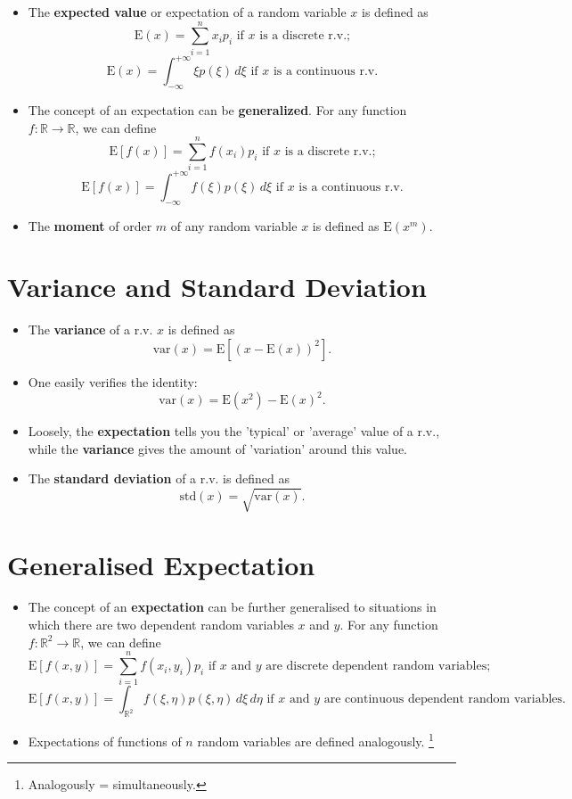 \begin{itemize}[label=\textbullet]
    \item The \textbf{expected value} or expectation of a random variable \( x \) is defined as
    \[
    \text{E}(x) = \sum_{i=1}^n x_i p_i \text{ if } x \text{ is a discrete r.v.;}
    \]
    \[
    \text{E}(x) = \int_{-\infty}^{+\infty} \xi p(\xi) \, d\xi \text{ if } x \text{ is a continuous r.v.}
    \]
    \item The concept of an expectation can be \textbf{generalized}. For any function \( f : \mathbb{R} \to \mathbb{R} \), we can define
    \[
    \text{E}[f(x)] = \sum_{i=1}^n f(x_i)p_i \text{ if } x \text{ is a discrete r.v.;}
    \]
    \[
    \text{E}[f(x)] = \int_{-\infty}^{+\infty} f(\xi) p(\xi) \, d\xi \text{ if } x \text{ is a continuous r.v.}
    \]
    \item The \textbf{moment} of order \( m \) of any random variable \( x \) is defined as \( \text{E}(x^m) \).
\end{itemize}

\section{Variance and Standard Deviation}

\begin{itemize}[label=\textbullet]
    \item The \textbf{variance} of a r.v. \( x \) is defined as
    \[
    \text{var}(x) = \text{E}[(x - \text{E}(x))^2].
    \]
    \item One easily verifies the identity:
    \[
    \text{var}(x) = \text{E}(x^2) - \text{E}(x)^2.
    \]
    \item Loosely, the \textbf{expectation} tells you the 'typical' or 'average' value of a r.v., while the \textbf{variance} gives the amount of 'variation' around this value.
    \item The \textbf{standard deviation} of a r.v. is defined as
    \[
    \text{std}(x) = \sqrt{\text{var}(x)}.
    \]
\end{itemize}

\section{Generalised Expectation}

\begin{itemize}[label=\textbullet]
    \item The concept of an \textbf{expectation} can be further generalised to situations in which there are two dependent random variables \( x \) and \( y \). For any function \( f : \mathbb{R}^2 \to \mathbb{R} \), we can define
    \[
    \text{E}[f(x, y)] = \sum_{i=1}^n f(x_i, y_i)p_i \text{ if } x \text{ and } y \text{ are discrete dependent random variables;}
    \]
    \[
    \text{E}[f(x, y)] = \int_{\mathbb{R}^2} f(\xi, \eta)p(\xi, \eta) \, d\xi \, d\eta \text{ if } x \text{ and } y \text{ are continuous dependent random variables.}
    \]
    \item Expectations of functions of \( n \) random variables are defined analogously. \footnote[]{Analogously = simultaneously.}
\end{itemize}

